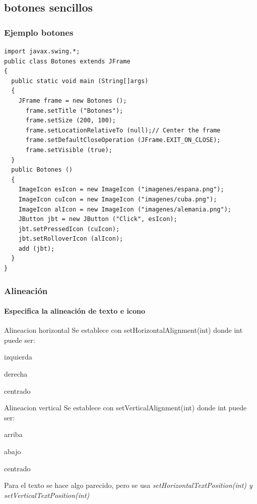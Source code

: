 \documentclass{beamer}
\begin{document}
\subsection{botones sencillos}
\begin{frame}[fragile]
\frametitle{Ejemplo botones}
\begin{scriptsize}
\begin{verbatim}
import javax.swing.*;
public class Botones extends JFrame
{
  public static void main (String[]args)
  {
    JFrame frame = new Botones ();
      frame.setTitle ("Botones");
      frame.setSize (200, 100);
      frame.setLocationRelativeTo (null);// Center the frame
      frame.setDefaultCloseOperation (JFrame.EXIT_ON_CLOSE);
      frame.setVisible (true);
  }
  public Botones ()
  {
    ImageIcon esIcon = new ImageIcon ("imagenes/espana.png");
    ImageIcon cuIcon = new ImageIcon ("imagenes/cuba.png");
    ImageIcon alIcon = new ImageIcon ("imagenes/alemania.png");
    JButton jbt = new JButton ("Click", esIcon);
    jbt.setPressedIcon (cuIcon);
    jbt.setRolloverIcon (alIcon);
    add (jbt);
  }
}
\end{verbatim}
\end{scriptsize}
\end{frame}

\begin{frame}
\frametitle{Alineación}
\framesubtitle{Especifica la alineación de texto e icono}
\begin{block}{Alineacion horizontal}
Se establece con \alert{setHorizontalAlignment(int)} donde int puede ser:
\begin{description}[<+->]
\item[LEADING/LEFT] izquierda
\item[RIGHT/TRAILING] derecha
\item[CENTER] centrado
\end{description}
\end{block}
\pause
\begin{block}{Alineacion vertical}
Se establece con \alert{setVerticalAlignment(int)} donde int puede ser:
\begin{description}[<+->]
\item[TOP] arriba
\item[BOTTOM] abajo
\item[CENTER] centrado
\end{description}
\end{block}
\pause
Para el texto se hace algo parecido, pero se usa \emph{setHorizontalTextPosition(int) y setVerticalTextPosition(int)}
\end{frame}
\end{document}
